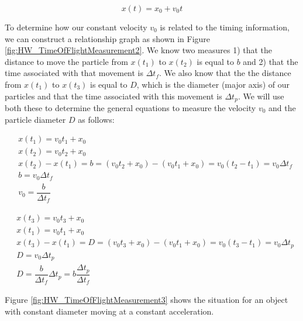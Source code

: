 \documentclass[11pt,letterpaper]{article}
\begin{document}
\begin{equation} \label{Eqn:HW_TimeOfFlightMeasurement3}
x(t) = x_0 + v_0t
\end{equation}

To determine how our constant velocity $v_0$ is related to the timing information, we can construct a relationship graph as shown in Figure \ref{fig:HW_TimeOfFlightMeasurement2}. We know two measures 1) that the distance to move the particle from $x(t_1)$ to $x(t_2)$ is equal to $b$ and 2) that the time associated with that movement is $\Delta t_f$. We also know that the the distance from $x(t_1)$ to $x(t_3)$ is equal to $D$, which is the diameter (major axis) of our particles and that the time associated with this movement is $\Delta t_p$. We will use both these to determine the general equations to measure the velocity $v_0$ and the particle diameter $D$ as follows: 

\begin{align}\label{Eqn:HW_TimeOfFlightMeasurement4}
&x(t_1) = v_0 t_1 + x_0 \\
&x(t_2) = v_0 t_2 + x_0 \\
&x(t_2) - x(t_1) = b = (v_0 t_2 + x_0) - (v_0 t_1 + x_0) = v_0 (t_2 - t_1) = v_0 \Delta t_f\\
&b = v_0 \Delta t_f\\
&v_0 = \dfrac{b}{\Delta t_f}
\end{align}

\begin{align}\label{Eqn:HW_TimeOfFlightMeasurement5}
&x(t_3) = v_0 t_3 + x_0 \\
&x(t_1) = v_0 t_1 + x_0 \\
&x(t_3) - x(t_1) = D = (v_0 t_3 + x_0) - (v_0 t_1 + x_0) = v_0 (t_3 - t_1) = v_0 \Delta t_p\\
&D = v_0 \Delta t_p\\
&D = \dfrac{b}{\Delta t_f} \Delta t_p = b \dfrac{\Delta t_p}{\Delta t_f}
\end{align}

Figure \ref{fig:HW_TimeOfFlightMeasurement3} shows the situation for an object with constant diameter moving at a constant acceleration. 
\end{document}
